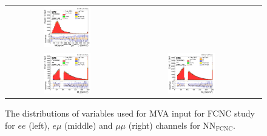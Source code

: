 \begin{figure}[ht]
\begin{center}
\begin{tabular}{ccc}
      \includegraphics[width=0.4\textwidth]{figures/tW/fig/FCNC_MVA_input/mumu/H_BSM_xj1b_M_l2_j1.png}\\
      \includegraphics[width=0.4\textwidth]{figures/tW/fig/FCNC_MVA_input/ee/H_BSM_xj1b_Mll.png}&
      \includegraphics[width=0.4\textwidth]{figures/tW/fig/FCNC_MVA_input/mumu/H_BSM_xj1b_Mll.png}\\
    \end{tabular}
    \caption{The distributions of variables used for MVA input for FCNC study for $ee$ (left), $e\mu$ (middle) and $\mu\mu$ (right) channels for NN$_{\text{FCNC}}$.
    \label{fig:MVA_FCNC_1j1t_3}}
  \end{center}
\end{figure}

